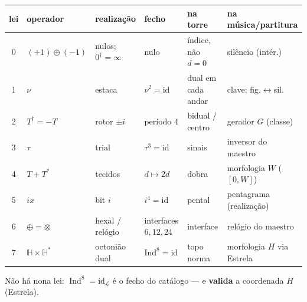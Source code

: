 \documentclass[11pt,a4paper]{article}
\begin{document}
\begin{center}\small
\begin{tabular}{@{}clllll@{}}
lei & operador & realização & fecho & na torre & na música/partitura \\
\hline
0 & $(+1)\oplus(-1)$ & nulos; $0^{\dagger}=\infty$ & nulo & índice, não $d=0$ & silêncio (intér.) \\
1 & $\nu$ & estaca & $\nu^{2}=\mathrm{id}$ & dual em cada andar & clave; fig.$\leftrightarrow$sil. \\
2 & $T^{\dagger}=-T$ & rotor $\pm i$ & período 4 & bidual / centro & gerador $G$ (classe) \\
3 & $\tau$ & trial & $\tau^{3}=\mathrm{id}$ & sinais & inversor do maestro \\
4 & $T+T^{*}$ & tecidos & $d\mapsto2d$ & dobra & morfologia $W$ ($[0,W]$) \\
5 & $ix$ & bit $i$ & $i^{4}=\mathrm{id}$ & pental & pentagrama (realização) \\
6 & $\oplus=\otimes$ & hexal / relógio & interfaces $6,12,24$ & interface & relógio do maestro \\
7 & $\mathbb{H}\times\mathbb{H}^{*}$ & octonião dual & $\mathrm{Ind}^{8}=\mathrm{id}$ & topo norma & morfologia $H$ via Estrela \\
\end{tabular}
\end{center}

\noindent Não há nona lei: $\operatorname{Ind}^{8}=\mathrm{id}_{\mathcal L}$ é o
fecho do catálogo --- e \textbf{valida} a coordenada $H$ (Estrela).
\end{document}
